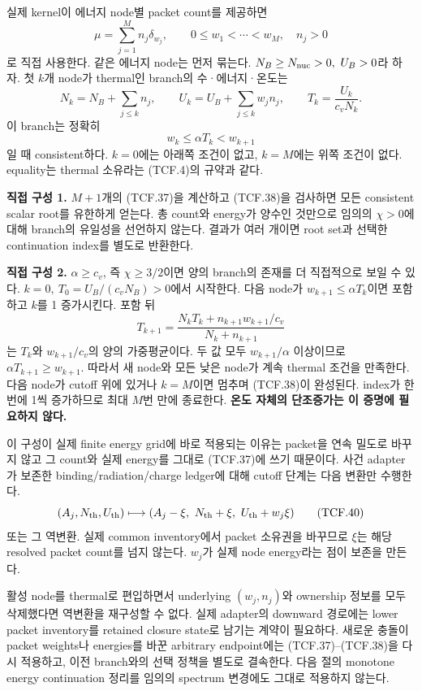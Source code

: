 실제 kernel이 에너지 node별 packet count를 제공하면 \[
\mu=\sum_{j=1}^{M}n_j\delta_{w_j},\qquad
0\le w_1<\cdots<w_M,\quad n_j>0
\tag{TCF.36}
\] 로 직접 사용한다. 같은 에너지 node는 먼저 묶는다. \(N_B\ge N_{\rm nuc}>0,\ U_B>0\)라 하자. 첫 \(k\)개 node가 thermal인 branch의 수·에너지·온도는 \[
N_k=N_B+\sum_{j\le k}n_j,\qquad
U_k=U_B+\sum_{j\le k}w_jn_j,\qquad
T_k=\frac{U_k}{c_vN_k}.
\tag{TCF.37}
\] 이 branch는 정확히 \[
w_k\le\alpha T_k<w_{k+1}
\tag{TCF.38}
\] 일 때 consistent하다. \(k=0\)에는 아래쪽 조건이 없고, \(k=M\)에는 위쪽 조건이 없다. equality는 thermal 소유라는 (TCF.4)의 규약과 같다.

\textbf{직접 구성 1.} \(M+1\)개의 (TCF.37)을 계산하고 (TCF.38)을 검사하면 모든 consistent scalar root를 유한하게 얻는다. 총 count와 energy가 양수인 것만으로 임의의 \(\chi>0\)에 대해 branch의 유일성을 선언하지 않는다. 결과가 여러 개이면 root set과 선택한 continuation index를 별도로 반환한다.

\textbf{직접 구성 2.} \(\alpha\ge c_v\), 즉 \(\chi\ge3/2\)이면 양의 branch의 존재를 더 직접적으로 보일 수 있다. \(k=0,\ T_0=U_B/(c_vN_B)>0\)에서 시작한다. 다음 node가 \(w_{k+1}\le\alpha T_k\)이면 포함하고 \(k\)를 1 증가시킨다. 포함 뒤 \[
T_{k+1}
=\frac{N_kT_k+n_{k+1}w_{k+1}/c_v}{N_k+n_{k+1}}
\tag{TCF.39}
\] 는 \(T_k\)와 \(w_{k+1}/c_v\)의 양의 가중평균이다. 두 값 모두 \(w_{k+1}/\alpha\) 이상이므로 \(\alpha T_{k+1}\ge w_{k+1}\). 따라서 새 node와 모든 낮은 node가 계속 thermal 조건을 만족한다. 다음 node가 cutoff 위에 있거나 \(k=M\)이면 멈추며 (TCF.38)이 완성된다. index가 한 번에 1씩 증가하므로 최대 \(M\)번 만에 종료한다. \textbf{온도 자체의 단조증가는 이 증명에 필요하지 않다.}

이 구성이 실제 finite energy grid에 바로 적용되는 이유는 packet을 연속 밀도로 바꾸지 않고 그 count와 실제 energy를 그대로 (TCF.37)에 쓰기 때문이다. 사건 adapter가 보존한 binding/radiation/charge ledger에 대해 cutoff 단계는 다음 변환만 수행한다. \[
(A_j,N_{\rm th},U_{\rm th})
\longmapsto
(A_j-\xi,\ N_{\rm th}+\xi,\ U_{\rm th}+w_j\xi)
\tag{TCF.40}
\] 또는 그 역변환. 실제 common inventory에서 packet 소유권을 바꾸므로 \(\xi\)는 해당 resolved packet count를 넘지 않는다. \(w_j\)가 실제 node energy라는 점이 보존을 만든다.

활성 node를 thermal로 편입하면서 underlying \((w_j,n_j)\)와 ownership 정보를 모두 삭제했다면 역변환을 재구성할 수 없다. 실제 adapter의 downward 경로에는 lower packet inventory를 retained closure state로 남기는 계약이 필요하다. 새로운 충돌이 packet weights나 energies를 바꾼 arbitrary endpoint에는 (TCF.37)--(TCF.38)을 다시 적용하고, 이전 branch와의 선택 정책을 별도로 결속한다. 다음 절의 monotone energy continuation 정리를 임의의 spectrum 변경에도 그대로 적용하지 않는다.


